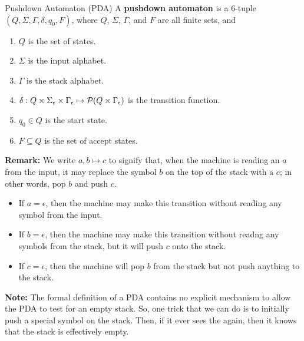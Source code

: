 \documentclass[letterpaper]{article}
\begin{document}
\begin{definition}{Pushdown Automaton (PDA)}{}
    A \textbf{pushdown automaton} is a 6-tuple $(Q, \Sigma, \Gamma, \delta, q_0, F)$, where $Q$, $\Sigma$, $\Gamma$, and $F$ are all finite sets, and
    \begin{enumerate}
        \item $Q$ is the set of states. 
        \item $\Sigma$ is the input alphabet. 
        \item $\Gamma$ is the stack alphabet.
        \item $\delta: Q \times \Sigma_{\epsilon} \times \Gamma_{\epsilon} \mapsto \mathcal{P}(Q \times \Gamma_{\epsilon})$ is the transition function.
        \item $q_0 \in Q$ is the start state. 
        \item $F \subseteq Q$ is the set of accept states. 
    \end{enumerate} 
\end{definition}
\textbf{Remark:} We write $a, b \mapsto c$ to signify that, when the machine is reading an $a$ from the input, it may replace the symbol $b$ on the top of the stack with a $c$; in other words, pop $b$ and push $c$. 
\begin{itemize}
    \item If $a = \epsilon$, then the machine may make this transition without reading any symbol from the input. 
    \item If $b = \epsilon$, then the machine may make this transition without readng any symbols from the stack, but it will push $c$ onto the stack. 
    \item If $c = \epsilon$, then the machine will pop $b$ from the stack but not push anything to the stack. 
\end{itemize}
\textbf{Note:} The formal definition of a PDA contains no explicit mechanism to allow the PDA to test for an empty stack. So, one trick that we can do is to initially push a special symbol \code{\$} on the stack. Then, if it ever sees the \code{\$} again, then it knows that the stack is effectively empty. 
\end{document}
